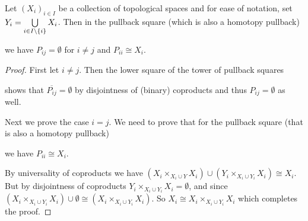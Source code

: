\begin{corollary}\label{cor:genCoproductComponentPb} %
    Let $\left(X_i\right)_{i\in I}$ be a collection of topological spaces and for ease of notation, set $Y_i=\bigcup\limits_{i\in I\setminus{\left\lbrace i\right\rbrace}}X_i$.
    Then in the pullback square (which is also a homotopy pullback)
    \begin{center}
    \end{center}
    we have $P_{ij}=\emptyset$ for $i\neq j$ and $P_{ii}\cong X_i$.
    \begin{proof}
        First let $i\neq j$.
        Then the lower square of the tower of pullback squares 
        \begin{center}
        \end{center}
        shows that $\overline{P_{ij}}=\emptyset$ by disjointness of (binary) coproducts and thus $P_{ij}=\emptyset$ as well.

        Next we prove the case $i=j$. 
        We need to prove that for the pullback square (that is also a homotopy pullback)
        \begin{center}
        \end{center}
        we have $P_{ii}\cong X_i$. 

        By universality of coproducts we have $\left(X_i\times_{X_i\cup Y}X_i\right)\cup\left(Y_i\times_{X_i\cup Y_i}X_i\right)\cong X_i$.
        But by disjointness of coproducts $Y_i\times_{X_i\cup Y_i}X_i=\emptyset$, and since $\left(X_i\times_{X_i\cup Y_i}X_i\right)\cup\emptyset\cong\left(X_i\times_{X_i\cup Y_i}X_i\right)$.
        So $X_i\cong X_i\times_{X_i\cup Y_i}X_i$ which completes the proof.
    \end{proof}
\end{corollary}
